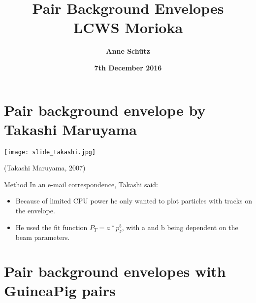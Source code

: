 \documentclass[xcolor={dvipsnames}]{beamer}
\title[ILC \& Muons from spoilers]{\textbf{\LARGE Pair Background Envelopes} \\ \vspace*{0.3cm} \small LCWS Morioka}
\author[Anne Sch\"utz]{\textbf{Anne Sch\"utz}}
\institute{\textbf{DESY}}
\date{\textbf{7th December 2016}}
\begin{document}
{
\begin{frame}
  \titlepage
\end{frame}
}
\begin{frame}
  \tableofcontents
\end{frame}

\section{Pair background envelope by Takashi Maruyama}
\begin{frame}
\begin{center}
  \texttt{[image: slide\_takashi.jpg]}
\end{center}
 \begin{flushright} 
  (Takashi Maruyama, 2007)
 \end{flushright}
\end{frame}
\begin{frame}{Method}
 In an e-mail correspondence, Takashi said:
 \begin{itemize}
 \item Because of limited CPU power he only wanted to plot particles with tracks on the envelope.
 \item He used the fit function $P_T = a*p_z^b$, with a and b being dependent on the beam parameters.
\end{itemize}
\end{frame}

\section{Pair background envelopes with GuineaPig pairs}
\end{document}
